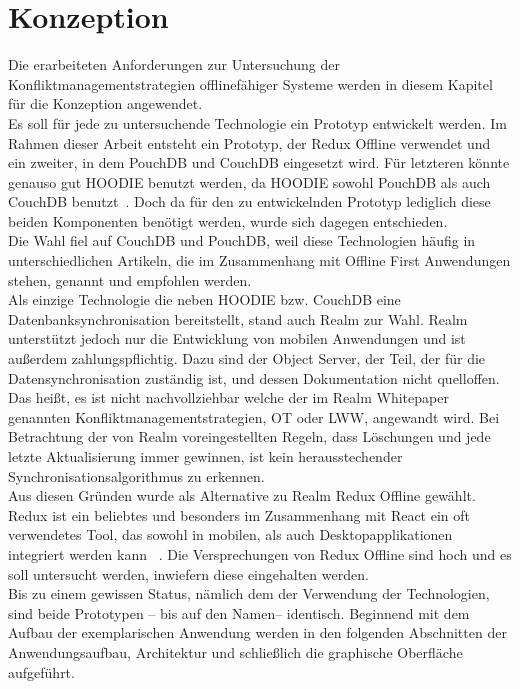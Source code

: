\chapter{\label{chap:konzeption}Konzeption}
Die erarbeiteten Anforderungen zur Untersuchung der Konfliktmanagementstrategien offlinefähiger Systeme werden in diesem Kapitel für die Konzeption angewendet.\\
Es soll für jede zu untersuchende Technologie ein Prototyp entwickelt werden.
Im Rahmen dieser Arbeit entsteht ein Prototyp, der Redux Offline verwendet und ein zweiter, in dem PouchDB und CouchDB eingesetzt wird.
Für letzteren könnte genauso gut HOODIE benutzt werden, da HOODIE sowohl PouchDB als auch CouchDB benutzt~\cite{hoodie-how}.
Doch da für den zu entwickelnden Prototyp lediglich diese beiden Komponenten benötigt werden, wurde sich dagegen entschieden.\\
%
Die Wahl fiel auf CouchDB und PouchDB, weil diese Technologien häufig in unterschiedlichen Artikeln, die im Zusammenhang mit Offline First Anwendungen stehen, genannt und empfohlen werden.\\
% 
Als einzige Technologie die neben HOODIE bzw. CouchDB eine Datenbanksynchronisation bereitstellt, stand auch Realm zur Wahl.
Realm unterstützt jedoch nur die Entwicklung von mobilen Anwendungen und ist außerdem zahlungspflichtig.
Dazu sind der Object Server, der Teil, der für die Datensynchronisation zuständig ist, und dessen Dokumentation nicht quelloffen.
Das heißt, es ist nicht nachvollziehbar welche der im Realm Whitepaper genannten Konfliktmanagementstrategien, \gls{OT} oder \gls{LWW}, angewandt wird.
Bei Betrachtung der von Realm voreingestellten Regeln, dass Löschungen und jede letzte Aktualisierung immer gewinnen, ist kein herausstechender Synchronisationsalgorithmus zu erkennen.\\
% 
Aus diesen Gründen wurde als Alternative zu Realm Redux Offline gewählt. Redux ist ein beliebtes und besonders im Zusammenhang mit React ein oft verwendetes Tool, das sowohl in mobilen, als auch Desktopapplikationen integriert werden kann ~\cite{statereact}.
Die Versprechungen von Redux Offline sind hoch und es soll untersucht werden, inwiefern diese eingehalten werden.\\
% 
% 
% 
Bis zu einem gewissen Status, nämlich dem der Verwendung der Technologien, sind beide Prototypen -- bis auf den Namen-- identisch.
Beginnend mit dem Aufbau der exemplarischen Anwendung werden in den folgenden Abschnitten der Anwendungsaufbau, Architektur und schließlich die graphische Oberfläche aufgeführt.
%
%
